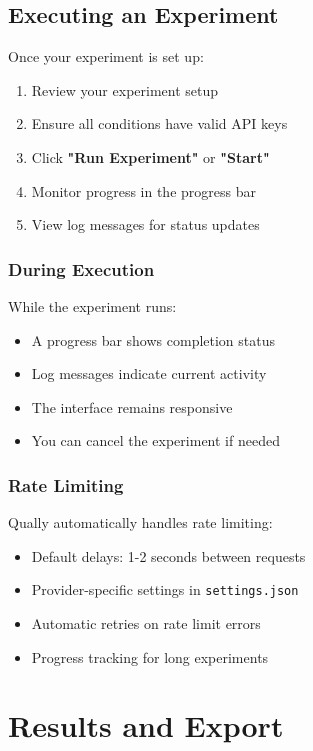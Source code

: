 \documentclass[11pt,a4paper]{article}
\begin{document}
\subsection{Executing an Experiment}
Once your experiment is set up:
\begin{enumerate}
    \item Review your experiment setup
    \item Ensure all conditions have valid API keys
    \item Click \textbf{"Run Experiment"} or \textbf{"Start"}
    \item Monitor progress in the progress bar
    \item View log messages for status updates
\end{enumerate}

\subsubsection{During Execution}
While the experiment runs:
\begin{itemize}
    \item A progress bar shows completion status
    \item Log messages indicate current activity
    \item The interface remains responsive
    \item You can cancel the experiment if needed
\end{itemize}

\subsubsection{Rate Limiting}
Qually automatically handles rate limiting:
\begin{itemize}
    \item Default delays: 1-2 seconds between requests
    \item Provider-specific settings in \texttt{settings.json}
    \item Automatic retries on rate limit errors
    \item Progress tracking for long experiments
\end{itemize}

\section{Results and Export}
\label{sec:results}
\end{document}
